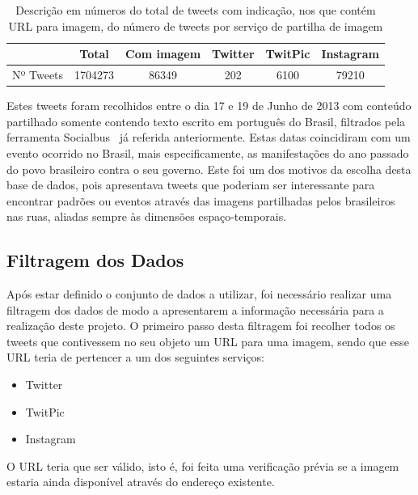 \vspace{5 mm}
\begin{table}[h]
\centering
\begin{tabular}{|l|c|c|l|l|l|}
\hline
          & Total                        & Com imagem & Twitter                  & TwitPic                   & Instagram                  \\ \hline
Nº Tweets & \multicolumn{1}{r|}{1704273} & 86349      & \multicolumn{1}{c|}{202} & \multicolumn{1}{c|}{6100} & \multicolumn{1}{c|}{79210} \\ \hline
\end{tabular}
\caption{Descrição em números do total de tweets com indicação, nos que contém URL para imagem, do número de tweets por serviço de partilha de imagem}
\label{tab:nbrtweets}
\end{table}
\vspace{5 mm}

Estes tweets foram recolhidos entre o dia 17 e 19 de Junho de 2013 com conteúdo partilhado somente contendo texto escrito em português do Brasil, filtrados pela ferramenta Socialbus~\cite{Boanjak2012} já referida anteriormente. Estas datas coincidiram com um evento ocorrido no Brasil, mais especificamente, as manifestações do ano passado do povo brasileiro contra o seu governo. Este foi um dos motivos da escolha desta base de dados, pois apresentava tweets que poderiam ser interessante para encontrar padrões ou eventos através das imagens partilhadas pelos brasileiros nas ruas, aliadas sempre às dimensões espaço-temporais. 

\subsection{Filtragem dos Dados}

Após estar definido o conjunto de dados a utilizar, foi necessário realizar uma filtragem dos dados de modo a apresentarem a informação necessária para a realização deste projeto. O primeiro passo desta filtragem foi recolher todos os tweets que contivessem no seu objeto um URL para uma imagem, sendo que esse URL teria de pertencer a um dos seguintes serviços: 

\begin{itemize}
\item Twitter
\item TwitPic
\item Instagram
\end{itemize}
O URL teria que ser válido, isto é, foi feita uma verificação prévia se a imagem estaria ainda disponível através do endereço existente.


